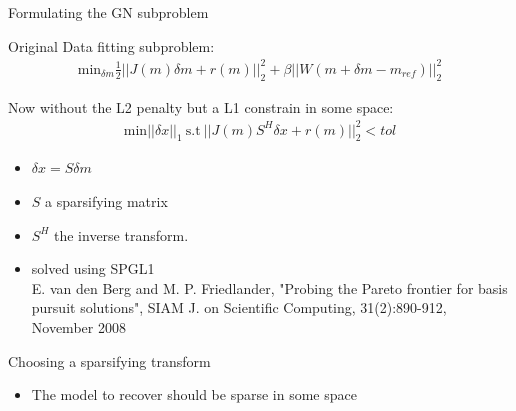 \documentclass[12pt]{beamer}
\begin{document}
\begin{frame}{Formulating the GN subproblem}

Original Data fitting subproblem:
\begin{align}
\text{min}_{\delta m} \frac{1}{2} ||J(m)\delta m + r(m)||_2^2 + \beta ||W(m+\delta m-m_{ref})||_2^2
\end{align}



Now without the L2 penalty but a L1 constrain in some space:
\begin{align}
\text{min} ||\delta x||_1 ~\text{s.t}~ ||J(m)S^H \delta x + r(m)||^2_2 < tol
\end{align}

\begin{itemize}
\item $\delta x = S \delta m$
\item $S$ a sparsifying matrix  
\item $S^H$ the inverse transform.
\item solved using SPGL1 \\
{\color{gray} E. van den Berg and M. P. Friedlander, "Probing the Pareto frontier for basis pursuit solutions", SIAM J. on Scientific Computing, 31(2):890-912, November 2008}
\end{itemize}
\end{frame}

\begin{frame}{Choosing a sparsifying transform}
\begin{itemize}
  \item The model to recover should be sparse in some space


\begin{figure}
\end{figure}

\end{itemize}

\end{frame}
\end{document}
